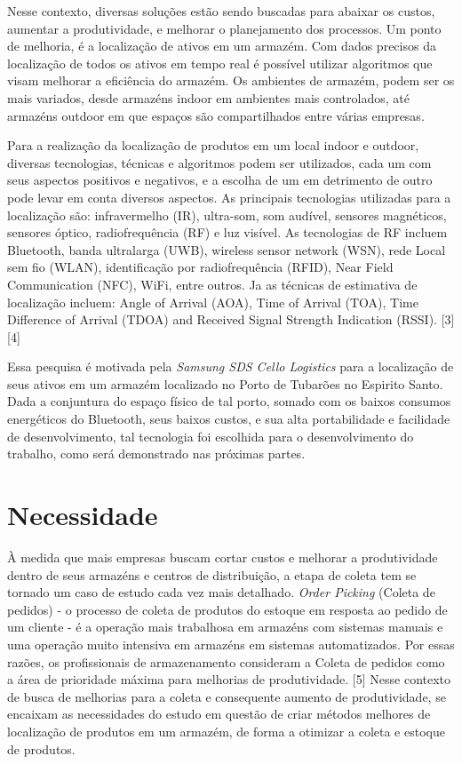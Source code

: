 \documentclass[]{politex}
\begin{document}
Nesse contexto, diversas soluções estão sendo buscadas para abaixar os custos, aumentar a produtividade, e melhorar o planejamento dos processos.
Um ponto de melhoria, é a localização de ativos em um armazém. Com dados precisos da localização de todos os ativos em tempo real é possível utilizar algoritmos que visam melhorar a eficiência do armazém.
Os ambientes de armazém, podem ser os mais variados, desde armazéns indoor em ambientes mais controlados, até armazéns outdoor em que espaços são compartilhados entre várias empresas.

Para a realização da localização de produtos em um local indoor e outdoor, diversas tecnologias, técnicas e algoritmos podem ser utilizados, cada um com seus aspectos positivos e negativos, e a escolha de um em detrimento de outro pode levar em conta diversos aspectos. As principais tecnologias utilizadas para a localização são: infravermelho (IR), ultra-som, som audível, sensores magnéticos, sensores óptico, radiofrequência (RF) e luz visível. As tecnologias de RF incluem Bluetooth, banda ultralarga (UWB), wireless sensor network (WSN), rede Local sem fio (WLAN), identificação por radiofrequência (RFID), Near Field Communication (NFC), WiFi, entre outros.
Ja as técnicas de estimativa de localização incluem: Angle of Arrival (AOA), Time of Arrival (TOA), Time Difference of Arrival (TDOA) and Received Signal Strength Indication (RSSI).  [3][4]

Essa pesquisa é motivada pela \textit{Samsung SDS Cello Logistics} para a localização de seus ativos em um armazém localizado no Porto de Tubarões no Espirito Santo. Dada a conjuntura do espaço físico de tal porto, somado com os baixos consumos energéticos do Bluetooth, seus baixos custos, e sua alta portabilidade e facilidade de desenvolvimento, tal tecnologia foi escolhida para o desenvolvimento do trabalho, como será demonstrado nas próximas partes.

\chapter{Necessidade}
À medida que mais empresas buscam cortar custos e melhorar a produtividade dentro de seus armazéns e centros de distribuição, a etapa de coleta tem se tornado um caso de estudo cada vez mais detalhado. \textit{Order Picking} (Coleta de pedidos) - o processo de coleta de produtos do estoque em resposta ao pedido de um cliente - é a operação mais trabalhosa em armazéns com sistemas manuais e uma operação muito intensiva em armazéns em sistemas automatizados. Por essas razões, os profissionais de armazenamento consideram a Coleta de pedidos como a área de prioridade máxima para melhorias de produtividade. [5]
Nesse contexto de busca de melhorias para a coleta e consequente aumento de produtividade, se encaixam as necessidades do estudo em questão de criar métodos melhores de localização de produtos em um armazém, de forma a otimizar a coleta e estoque de produtos.
\end{document}
